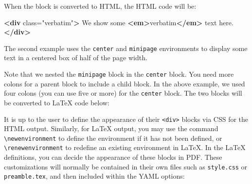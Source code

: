 \documentclass[
  11pt,
]{krantz}
\newenvironment{Shaded}{\begin{snugshade}}{\end{snugshade}}
\newcommand{\ExtensionTok}[1]{#1}
\newcommand{\FunctionTok}[1]{\textcolor[rgb]{0,0,0}{#1}}
\newcommand{\KeywordTok}[1]{\textcolor[rgb]{0.27,0.27,0.27}{\textbf{#1}}}
\newcommand{\NormalTok}[1]{#1}
\newcommand{\OtherTok}[1]{\textcolor[rgb]{0.37,0.37,0.37}{#1}}
\newcommand{\StringTok}[1]{\textcolor[rgb]{0.5,0.5,0.5}{#1}}
\begin{document}
When the block is converted to HTML, the HTML code will be:

\begin{Shaded}
\begin{Highlighting}[]
\KeywordTok{<div}\OtherTok{ class=}\StringTok{"verbatim"}\KeywordTok{>}
\NormalTok{We show some }\KeywordTok{<em>}\NormalTok{verbatim}\KeywordTok{</em>}\NormalTok{ text here.}
\KeywordTok{</div>}
\end{Highlighting}
\end{Shaded}

The second example uses the \texttt{center} and \texttt{minipage} environments to display some text in a centered box of half of the page width.

\begin{Shaded}
\end{Shaded}

Note that we nested the \texttt{minipage} block in the \texttt{center} block. You need more colons for a parent block to include a child block. In the above example, we used four colons (you can use five or more) for the \texttt{center} block. The two blocks will be converted to LaTeX code below:

\begin{Shaded}
\end{Shaded}

It is up to the user to define the appearance of their \texttt{\textless{}div\textgreater{}} blocks via CSS for the HTML output. Similarly, for LaTeX output, you may use the command \texttt{\textbackslash{}newenvironment} to define the environment if it has not been defined, or \texttt{\textbackslash{}renewenvironment} to redefine an existing environment in LaTeX. In the LaTeX definitions, you can decide the appearance of these blocks in PDF. These customizations will normally be contained in their own files such as \texttt{style.css} or \texttt{preamble.tex}, and then included within the YAML options:
\end{document}
